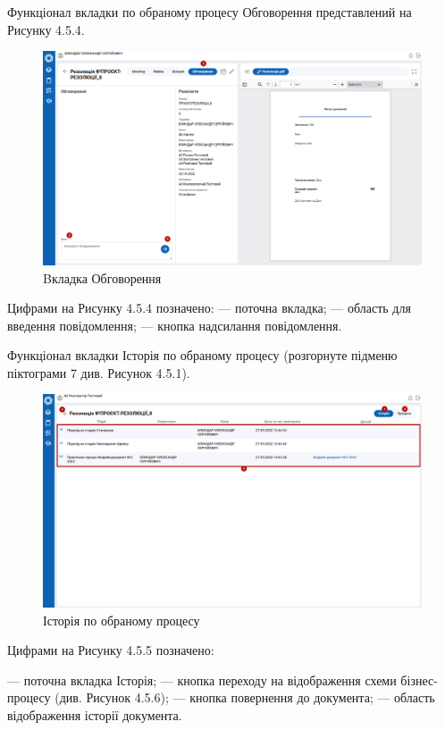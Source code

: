 Функціонал вкладки по обраному процесу Обговорення представлений на
Рисунку 4.5.4.

\begin{figure}[!htbp]
\centerline{\includegraphics[width=\textwidth]{img/4.5.4.png}}
\caption{Bкладка Обговорення}
\end{figure}

Цифрами на Рисунку 4.5.4 позначено:
 --- поточна вкладка;
 --- область для введення повідомлення;
 --- кнопка надсилання повідомлення.

Функціонал вкладки Історія по обраному процесу (розгорнуте підменю
піктограми 7 див. Рисунок 4.5.1).

\begin{figure}[!htbp]
\centerline{\includegraphics[width=\textwidth]{img/4.5.5.png}}
\caption{Історія по обраному процесу}
\end{figure}

Цифрами на Рисунку 4.5.5 позначено:

 --- поточна вкладка Історія;
 --- кнопка переходу на відображення схеми бізнес-процесу (див. Рисунок 4.5.6);
 --- кнопка повернення до документа;
 --- область відображення історії документа.

